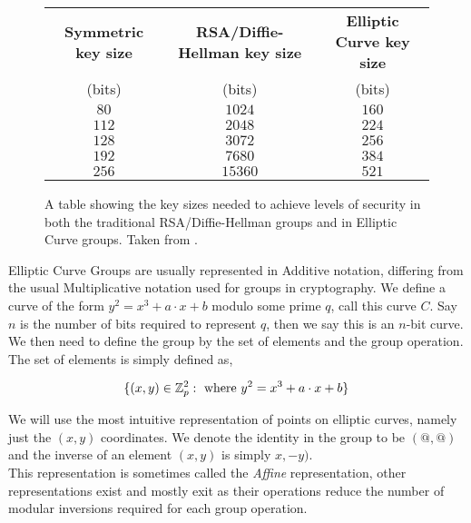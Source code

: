 \documentclass[ %
                    author={Nicholas Tutte},
                supervisor={Prof. Nigel Smart},
                    degree={MEng},
                     title={Secure Two Party Computation},
                  subtitle={A practical comparison of recent protocols},
                      type={Research - GG1K},
                      year={2015} ]{dissertation}
\begin{document}
			\begin{figure}[!htb]
				\begin{tabular}{| c | c | c |}
					\hline
					\textbf{Symmetric key size} & \textbf{RSA/Diffie-Hellman key size} & \textbf{Elliptic Curve key size} \\
					(bits) & (bits) & (bits) \\
					\hline
					\hline
					$80$ & $1024$ & $160$ \\
					\hline
					$112$ & $2048$ & $224$ \\
					\hline
					$128$ & $3072$ & $256$ \\
					\hline
					$192$ & $7680$ & $384$ \\
					\hline
					$256$ & $15360$ & $521$ \\
					\hline
				\end{tabular}

				\caption{A table showing the key sizes needed to achieve levels of security in both the traditional RSA/Diffie-Hellman groups and in Elliptic Curve groups. Taken from \cite{NSA_CaseForECC}. \label{fig:NSA_ECC_Table}}
			\end{figure}

			Elliptic Curve Groups are usually represented in Additive notation, differing from the usual Multiplicative notation used for groups in cryptography. We define a curve of the form $y^2 = x^3 + a\cdot x + b$ modulo some prime $q$, call this curve $C$. Say $n$ is the number of bits required to represent $q$, then we say this is an $n$-bit curve.\\

			We then need to define the group by the set of elements and the group operation. The set of elements is simply defined as,

			$$\{(x, y) \in \mathbb{Z}_p^2 : \textnormal{ where } y^2 = x^3 + a\cdot x + b\} $$

			We will use the most intuitive representation of points on elliptic curves, namely just the $(x, y)$ coordinates. We denote the identity in the group to be $(@, @)$ and the inverse of an element $(x, y)$ is simply $x, -y)$.\\

			This representation is sometimes called the \emph{Affine} representation, other representations exist and mostly exit as their operations reduce the number of modular inversions required for each group operation.\\
\end{document}
